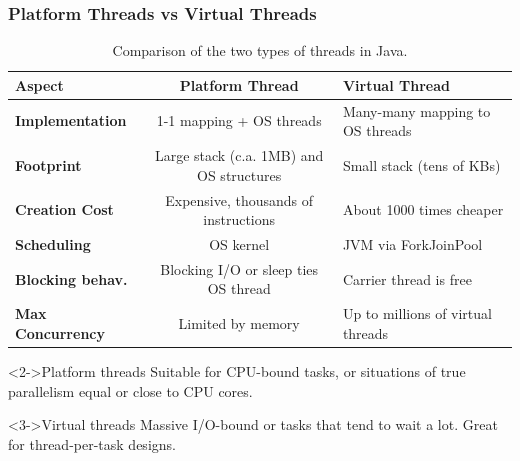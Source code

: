 \documentclass[xcolor={dvipsnames,svgnames},aspectratio=169]{beamer}
\begin{document}
\begin{frame}[fragile, shrink=15]
  \frametitle{Platform Threads vs Virtual Threads}

    \begin{table}[h]
    \centering
    \begin{tabularx}{\textwidth}{|l|c|X|}
      \hline
      \textbf{Aspect} & \textbf{Platform Thread} & \textbf{Virtual Thread} \\
      \hline
      \textbf{Implementation} & 1-1 mapping + OS threads & Many-many mapping to
      OS threads\\
      \hline
      \textbf{Footprint} & Large stack (c.a. 1MB) and OS structures
      & Small stack (tens of KBs) \\
      \hline
      \textbf{Creation Cost} & Expensive, thousands of instructions & About 1000
      times cheaper \\
      \hline
      \textbf{Scheduling} & OS kernel & JVM via ForkJoinPool \\
      \hline
      \textbf{Blocking behav.} & Blocking I/O or sleep ties OS thread
      & Carrier thread is free\\
      \hline
      \textbf{Max Concurrency} & Limited by memory & Up to millions of virtual threads \\
      \hline
    \end{tabularx}
    \caption{Comparison of the two types of threads in Java.}
  \end{table}

  \begin{block}<2->{\faLightbulb \quad Platform threads}
    Suitable for CPU-bound tasks, or situations of true parallelism equal or
    close to CPU cores.
  \end{block}
  \vspace{0.2cm}
    \begin{block}<3->{\faLightbulb \quad Virtual threads}
      Massive I/O-bound or tasks that tend to wait a lot. Great for thread-per-task designs.
  \end{block}

\end{frame}
\end{document}
